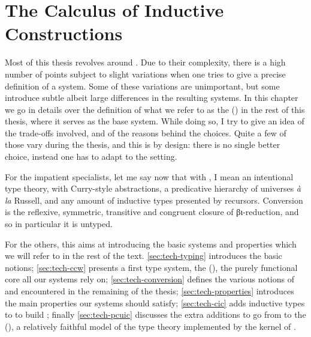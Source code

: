 \chapter{The Calculus of Inductive Constructions}
\label{chap:tech-intro}

\margintoc

Most of this thesis revolves around .
Due to their complexity, there is a high number of
points subject to slight variations
when one tries to give a precise definition of a system.
Some of these variations are unimportant, but some introduce subtle albeit large differences
in the resulting systems. In this chapter we go in details over
the definition of what we refer to as the
 () in the rest of this
thesis, where it serves as the base system.
While doing so, I try to give an idea of the trade-offs involved, and of the reasons
behind the choices. Quite a few of those vary during the thesis,
and this is by design: there is no single better choice,
instead one has to adapt to the setting.

For the impatient specialists, let me say now that with , I
mean an intentional type theory, with Curry-style abstractions,
a predicative hierarchy of universes%
\textit{à la} Russell, and any amount of inductive types presented by recursors.
Conversion is the reflexive, symmetric, transitive and congruent
closure of βι-reduction, and so in particular it is untyped.

For the others, this  aims at introducing the basic
systems and properties which we will refer to in the rest of the text.
\cref{sec:tech-typing} introduces the basic notions;
\cref{sec:tech-ccw} presents a first type system,
the  (),
the purely functional core all our systems rely on;
\cref{sec:tech-conversion} defines the various notions of  and
 encountered in the remaining of the thesis;
\cref{sec:tech-properties} introduces the main properties our systems should satisfy;
\cref{sec:tech-cic} adds inductive types to  to build
; finally \cref{sec:tech-pcuic} discusses the extra additions to go from
 to the 
(), a relatively faithful model of the type theory implemented by the
kernel of .

